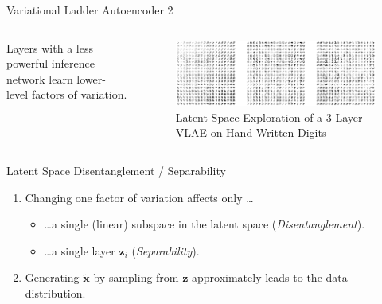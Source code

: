 \documentclass{beamer}
\begin{document}
    \begin{frame}{Variational Ladder Autoencoder 2}
        \begin{columns}
            \begin{column}{0.3\textwidth}
                Layers with a less powerful inference network learn lower-level factors of variation.
            \end{column}
            \begin{column}{0.68\textwidth}
                \begin{figure}
                    \centering
                    \includegraphics[width=\textwidth]{images/latent_space_traversals/vlae_mnist.png}
                    \caption{Latent Space Exploration of a 3-Layer VLAE on Hand-Written Digits}
                    \label{fig:vlae_mnist}
                \end{figure}
            \end{column}
        \end{columns}
    \end{frame}
    \begin{frame}{Latent Space Disentanglement / Separability}
        \begin{enumerate}
            \item Changing one factor of variation affects only \ldots
            \begin{itemize}
                \item \ldots a single (linear) subspace in the latent space (\textit{Disentanglement}).
                \item \ldots a single layer $\bm{z}_i$ (\textit{Separability}).
            \end{itemize}
            \item Generating $\bm{\tilde{x}}$ by sampling from $\bm{z}$ approximately leads to the data distribution.
        \end{enumerate}
    \end{frame}
\end{document}
